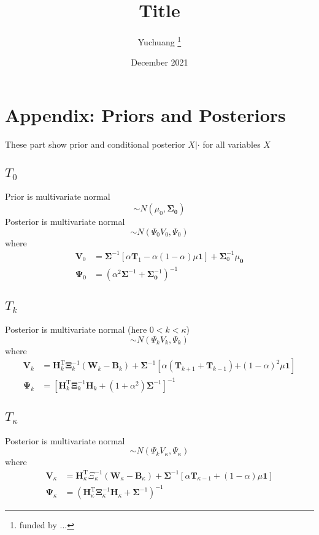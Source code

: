 \documentclass[12pt, letterpaper]{article}
\title{Title}
\author{Yuchuang \thanks{funded by ...}}
\date{December 2021}
\begin{document}
	
\appendix
\section{Appendix: Priors and Posteriors}
These part show prior and conditional posterior $X|\cdot$ for all variables $X$

\subsection{$T_0$}
Prior is multivariate normal
\begin{equation}
	\sim N\left(\mu_{0}, \mathbf{\Sigma_0}\right)
\end{equation}
Posterior is multivariate normal
\begin{equation}
	\sim N(\Psi_0V_0,\Psi_0)
\end{equation} 
where
\begin{align}
\mathbf{V}_{0}&=\mathbf{\Sigma}^{-1}\left[\alpha \mathbf{T}_{1}-\alpha(1-\alpha) \mu \mathbf{1}\right]+\mathbf{\Sigma}_{0}^{-1} \mu_{\mathbf{0}}\\
\boldsymbol{\Psi}_{0}&=\left(\alpha^{2} \boldsymbol{\Sigma}^{-1}+\boldsymbol{\Sigma}_{\mathbf{0}}^{-1}\right)^{-1}
\end{align}


\subsection{$T_k$}
Posterior is multivariate normal (here $0<k<\kappa$)
\begin{equation}
	\sim N(\Psi_kV_k,\Psi_k)
\end{equation} 
where
\begin{align}
\mathbf{V}_{k}&= \mathbf{H}_{k}^{\mathrm{T}} \mathbf{\Xi}_{k}^{-1}\left(\mathbf{W}_{k}-\mathbf{B}_{k}\right)+\mathbf{\Sigma}^{-1}\left[\alpha\left(\mathbf{T}_{k+1}+\mathbf{T}_{k-1}\right)\right.\left.+(1-\alpha)^{2} \mu \mathbf{1}\right]\\
\boldsymbol{\Psi}_{k}&=\left[\mathbf{H}_{k}^{\mathrm{T}} \boldsymbol{\Xi}_{k}^{-1} \mathbf{H}_{k}+\left(1+\alpha^{2}\right) \mathbf{\Sigma}^{-1}\right]^{-1}
\end{align}

\subsection{$T_\kappa$}

Posterior is multivariate normal
\begin{equation}
	\sim N(\Psi_kV_\kappa,\Psi_\kappa)
\end{equation} 
where
\begin{align}
\mathbf{V}_{\kappa}&=\mathbf{H}_{\kappa}^{\mathrm{T}} \Xi_{\kappa}^{-1}\left(\mathbf{W}_{\kappa}-\mathbf{B}_{\kappa}\right)+\mathbf{\Sigma}^{-1}\left[\alpha \mathbf{T}_{\kappa-1}+(1-\alpha) \mu \mathbf{1}\right]\\
\boldsymbol{\Psi}_{\kappa}&=\left(\mathbf{H}_{\kappa}^{\mathrm{T}} \boldsymbol{\Xi}_{\kappa}^{-1} \mathbf{H}_{\kappa}+\boldsymbol{\Sigma}^{-1}\right)^{-1}
\end{align}
\end{document}
